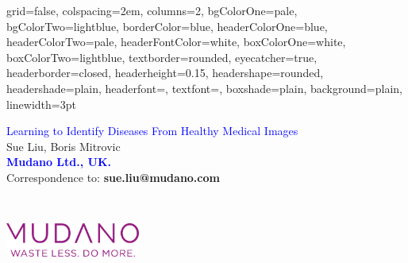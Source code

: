 \documentclass[portrait,final,a0paper,fontscale=0.32]{baposter}
\begin{document}



\begin{poster}%
  {
  grid=false,
  colspacing=2em,
  columns=2,
  bgColorOne=pale,
  bgColorTwo=lightblue,
  borderColor=blue,
  headerColorOne=blue,
  headerColorTwo=pale,
  headerFontColor=white,
  boxColorOne=white,
  boxColorTwo=lightblue,
  textborder=rounded,
  eyecatcher=true,
  headerborder=closed,
  headerheight=0.15\textheight,
  headershape=rounded,
  headershade=plain,
  headerfont=\Large\textsc, %
  textfont={\setlength{\parindent}{0em}},
  boxshade=plain,
  background=plain,
  linewidth=3pt
  }
  { } 
  {\begin{flushleft}
      \textcolor{blue}{\textnormal{\Huge Learning to Identify Diseases From Healthy Medical Images}} \\
      \textnormal{\large Sue Liu, Boris Mitrovic}\\\vspace{-2mm}
      \textcolor{blue}{\textnormal{\large\textbf{Mudano Ltd., UK.}}}\\\vspace{-3mm}
      \textnormal{\normalsize Correspondence to: \textbf{sue.liu@mudano.com}}\vspace{-10mm}
    \end{flushleft}
          \includegraphics[height=0.0em]{img/mudano_logo}}
     
  {%
     \includegraphics[height=3em]{img/mudano_logo}
 
 }
%


\end{poster}
\end{document}
